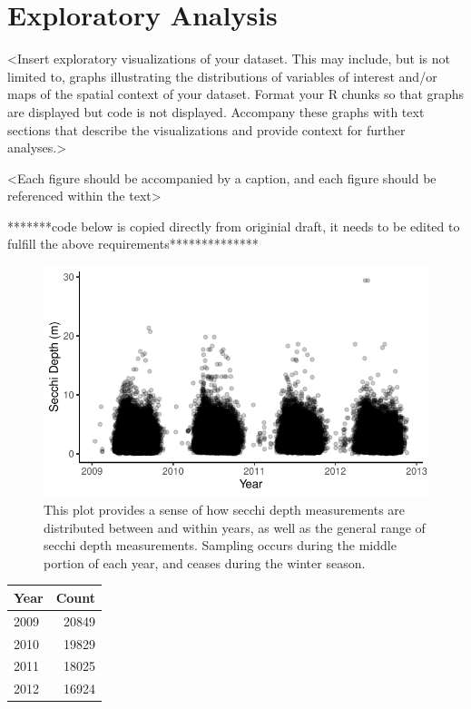 \documentclass[12pt,]{article}
\begin{document}
\hypertarget{exploratory-analysis}{%
\section{Exploratory Analysis}\label{exploratory-analysis}}

\textless Insert exploratory visualizations of your dataset. This may
include, but is not limited to, graphs illustrating the distributions of
variables of interest and/or maps of the spatial context of your
dataset. Format your R chunks so that graphs are displayed but code is
not displayed. Accompany these graphs with text sections that describe
the visualizations and provide context for further
analyses.\textgreater{}

\textless Each figure should be accompanied by a caption, and each
figure should be referenced within the text\textgreater{}

*******code below is copied directly from originial draft, it needs to
be edited to fulfill the above requirements**************

\begin{figure}
\centering
\includegraphics{Bollt_Greif_Raby_Roth_Draft_1115_files/figure-latex/Visualize_data-1.pdf}
\caption{This plot provides a sense of how secchi depth measurements are
distributed between and within years, as well as the general range of
secchi depth measurements. Sampling occurs during the middle portion of
each year, and ceases during the winter season.}
\end{figure}

\begin{longtable}[]{@{}lr@{}}
\toprule
Year & Count\tabularnewline
\midrule
\endhead
2009 & 20849\tabularnewline
2010 & 19829\tabularnewline
2011 & 18025\tabularnewline
2012 & 16924\tabularnewline
\bottomrule
\end{longtable}
\end{document}
